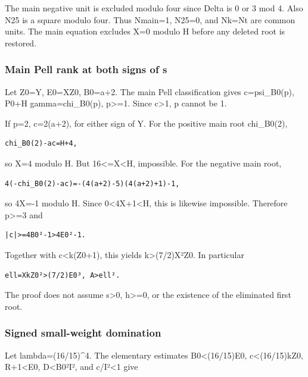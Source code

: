 \documentclass[
  10pt,
]{article}
\begin{document}
The main negative unit is excluded modulo four since Delta is 0 or 3 mod
4. Also N25 is a square modulo four. Thus Nmain=1, N25=0, and Nk=Nt are
common units. The main equation excludes X=0 modulo H before any deleted
root is restored.

\subsubsection{Main Pell rank at both signs of
s}\label{main-pell-rank-at-both-signs-of-s}

Let Z0=\textbar Y\textbar, E0=XZ0, B0=\textbar a+2\textbar. The main
Pell classification gives \textbar c\textbar=psi\_B0(p), \textbar P0+H
gamma\textbar=chi\_B0(p), p\textgreater=1. Since
\textbar c\textbar\textgreater1, p cannot be 1.

If p=2, c=2(a+2), for either sign of Y. For the positive main root
chi\_B0(2),

\begin{verbatim}
chi_B0(2)-ac=H+4,
\end{verbatim}

so X=4 modulo H. But 16\textless=X\textless\textbar H\textbar,
impossible. For the negative main root,

\begin{verbatim}
4(-chi_B0(2)-ac)=-(4(a+2)-5)(4(a+2)+1)-1,
\end{verbatim}

so 4X=-1 modulo H. Since 0\textless4X+1\textless\textbar H\textbar, this
is likewise impossible. Therefore p\textgreater=3 and

\begin{verbatim}
|c|>=4B0²-1>4E0²-1.
\end{verbatim}

Together with \textbar c\textbar\textless k(Z0+1), this yields
k\textgreater(7/2)X²Z0. In particular

\begin{verbatim}
ell=XkZ0²>(7/2)E0³, A>ell².
\end{verbatim}

The proof does not assume s\textgreater0, h\textgreater=0, or the
existence of the eliminated first root.

\subsubsection{Signed small-weight
domination}\label{signed-small-weight-domination}

Let lambda=(16/15)\^{}4. The elementary estimates B0\textless(16/15)E0,
\textbar c\textbar\textless(16/15)kZ0, R+1\textless E0,
D\textless B0²I², and \textbar c\textbar/I²\textless1 give
\end{document}

